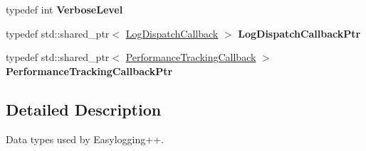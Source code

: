 \begin{DoxyCompactItemize}
\item 
typedef int {\bfseries Verbose\+Level}\hypertarget{namespaceel_1_1base_1_1type_a3f79fa74639a13c32f794ba074fe7fb4}{}\label{namespaceel_1_1base_1_1type_a3f79fa74639a13c32f794ba074fe7fb4}

\item 
typedef std\+::shared\+\_\+ptr$<$ \hyperlink{classel_1_1LogDispatchCallback}{Log\+Dispatch\+Callback} $>$ {\bfseries Log\+Dispatch\+Callback\+Ptr}\hypertarget{namespaceel_1_1base_1_1type_a887283511935c7a6d5ca99df8099f33f}{}\label{namespaceel_1_1base_1_1type_a887283511935c7a6d5ca99df8099f33f}

\item 
typedef std\+::shared\+\_\+ptr$<$ \hyperlink{classel_1_1PerformanceTrackingCallback}{Performance\+Tracking\+Callback} $>$ {\bfseries Performance\+Tracking\+Callback\+Ptr}\hypertarget{namespaceel_1_1base_1_1type_a01a715419060d65c31b71fd8d067abdd}{}\label{namespaceel_1_1base_1_1type_a01a715419060d65c31b71fd8d067abdd}

\end{DoxyCompactItemize}


\subsection{Detailed Description}
Data types used by Easylogging++. 